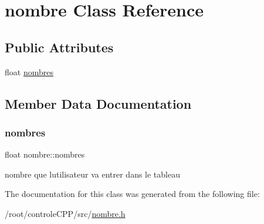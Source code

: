 \hypertarget{classnombre}{}\section{nombre Class Reference}
\label{classnombre}
\subsection*{Public Attributes}
\begin{DoxyCompactItemize}
\item 
float \hyperlink{classnombre_a66f9023cc685cb2bd2aec6c8440b91e5}{nombres}
\end{DoxyCompactItemize}


\subsection{Member Data Documentation}
\mbox{\label{classnombre_a66f9023cc685cb2bd2aec6c8440b91e5}} 
\subsubsection{\texorpdfstring{nombres}{nombres}}
{\footnotesize\ttfamily float nombre\+::nombres}

nombre que l\textquotesingle{}utilisateur va entrer dans le tableau 

The documentation for this class was generated from the following file\+:\begin{DoxyCompactItemize}
\item 
/root/controle\+C\+P\+P/src/\hyperlink{nombre_8h}{nombre.\+h}\end{DoxyCompactItemize}
